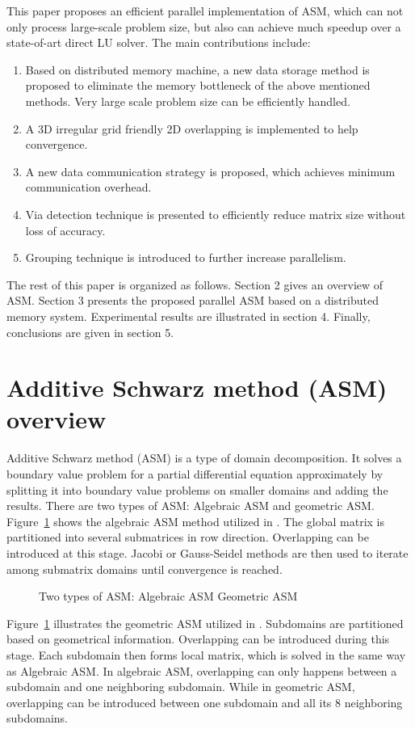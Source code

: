 \documentclass{sig-alternate}
\begin{document}
	This paper proposes an efficient parallel implementation of ASM, which can not only process large-scale problem size, 
	but also can achieve much speedup over a state-of-art direct LU solver. The main contributions include:
	\begin{enumerate}[1)]
	\item Based on distributed memory machine, a new data storage method is proposed to eliminate the memory bottleneck of
	the above mentioned methods. Very large scale problem size can be efficiently handled.
	\item A 3D irregular grid friendly 2D overlapping is implemented to help convergence. 
	\item A new data communication strategy is proposed, which achieves minimum communication overhead.
	\item Via detection technique is presented to efficiently reduce matrix size without loss of accuracy.
	\item Grouping technique is introduced to further increase parallelism.
	\end{enumerate}

	The rest of this paper is organized as follows. Section 2 gives an overview of ASM. Section 3 presents 
	the proposed parallel ASM based on a distributed memory system. Experimental results are illustrated in section 4. 
	Finally, conclusions are given in section 5.

\section{Additive Schwarz method (ASM) overview}	
	Additive Schwarz method (ASM) is a type of domain decomposition. It solves a boundary value problem for a partial 
	differential equation approximately by splitting it into boundary value problems on smaller domains and adding the results.
	There are two types of ASM: Algebraic ASM and geometric ASM. 
	Figure~\ref{Fig2} shows the algebraic ASM method utilized in \cite{kaisun}. The global matrix
	is partitioned into several submatrices in row direction. 
	Overlapping can be introduced at this stage. Jacobi or Gauss-Seidel methods are then used to iterate among submatrix domains until 
	convergence is reached.
	\begin{figure}[htbp]
	  \caption{Two types of ASM: 
	   Algebraic ASM
	   Geometric ASM}
	  \label{Fig2}
	\end{figure}
	Figure~\ref{Fig2} illustrates the geometric ASM utilized in \cite{Zhongyu}. Subdomains are partitioned based on
	geometrical information. Overlapping can be introduced during this stage. Each subdomain then forms local matrix, which is
	solved in the same way as Algebraic ASM.
	In algebraic ASM, overlapping can only happens between a subdomain and one neighboring subdomain. While in 
	geometric ASM, overlapping can be introduced between one subdomain and all its 8 neighboring subdomains.
	
\end{document}
